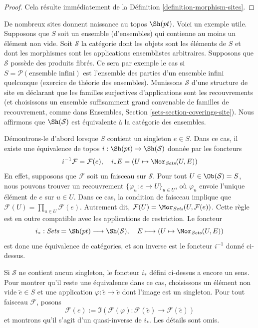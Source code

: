 \begin{proof}
Cela résulte immédiatement de la Définition \ref{definition-morphism-sites}.
\end{proof}

\begin{remark}
\label{remark-pt-topos}
De nombreux sites donnent naissance au topos $\Sh(pt)$.
Voici un exemple utile. Supposons que $S$ soit un ensemble (d’ensembles)
qui contienne au moins un élément non vide. Soit $\mathcal{S}$ la
catégorie dont les objets sont les éléments de $S$ et dont les morphismes sont
les applications ensemblistes arbitraires. Supposons que $\mathcal{S}$ possède des produits fibrés.
Ce sera par exemple le cas si $S = \mathcal{P}(\text{ensemble infini})$
est l’ensemble des parties d’un ensemble infini quelconque (exercice de théorie des ensembles).
Munissons $\mathcal{S}$ d’une structure de site en déclarant que
les familles surjectives d’applications sont les recouvrements (et choisissons
un ensemble suffisamment grand convenable de familles de recouvrement, comme dans
Ensembles, Section \ref{sets-section-coverings-site}).
Nous affirmons que $\Sh(\mathcal{S})$ est équivalente à la catégorie des
ensembles.

\medskip\noindent
Démontrons-le d’abord lorsque $S$ contient un singleton $e \in S$.
Dans ce cas, il existe une équivalence de topos
$i : \Sh(pt) \to \Sh(\mathcal{S})$ donnée par
les foncteurs
\begin{equation}
\label{equation-sheaves-pt-sets}
i^{-1}\mathcal{F} = \mathcal{F}(e), \quad
i_*E = (U \mapsto \Mor_{\textit{Sets}}(U, E))
\end{equation}
En effet, supposons que $\mathcal{F}$ soit un faisceau sur $\mathcal{S}$.
Pour tout $U \in \Ob(\mathcal{S}) = S$, nous pouvons trouver un recouvrement
$\{\varphi_u : e \to U\}_{u \in U}$, où $\varphi_u$
envoie l’unique élément de $e$ sur $u \in U$. Dans ce cas, la condition de faisceau
implique que
$\mathcal{F}(U) = \prod_{u \in U} \mathcal{F}(e)$.
Autrement dit,
$\mathcal{F}(U) = \Mor_{\textit{Sets}}(U, \mathcal{F}(e))$.
Cette règle est en outre compatible avec les applications de restriction. Le foncteur
$$
i_* :
\textit{Sets} = \Sh(pt)
\longrightarrow
\Sh(\mathcal{S}), \quad
E \longmapsto (U \mapsto \Mor_{\textit{Sets}}(U, E))
$$
est donc une équivalence de catégories, et son inverse est le foncteur
$i^{-1}$ donné ci-dessus.

\medskip\noindent
Si $\mathcal{S}$ ne contient aucun singleton, le foncteur
$i_*$ défini ci-dessus a encore un sens. Pour montrer qu’il reste
une équivalence dans ce cas, choisissons un élément non vide $\tilde e \in S$
et une application $\varphi : \tilde e \to \tilde e$ dont l’image est un singleton.
Pour tout faisceau $\mathcal{F}$, posons
$$
\mathcal{F}(e) :=
\Im(
\mathcal{F}(\varphi) :
\mathcal{F}(\tilde e)
\longrightarrow
\mathcal{F}(\tilde e)
)
$$
et montrons qu’il s’agit d’un quasi-inverse de $i_*$. Les détails sont omis.
\end{remark}

